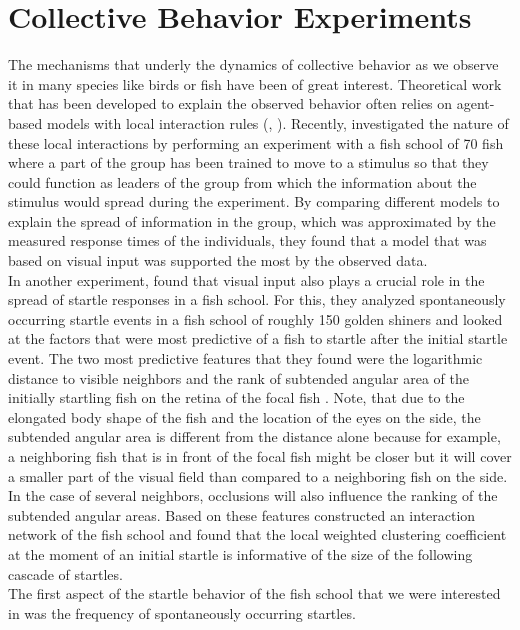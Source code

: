 \documentclass[a4paper,10pt,hidelinks]{scrreprt}
\begin{document}
    \section{Collective Behavior Experiments}
    The mechanisms that underly the dynamics of collective behavior as we observe it in many species like birds or fish have been of great interest.
    Theoretical work that has been developed to explain the observed behavior often relies on agent-based models with local interaction rules (\cite{Couzin2002}, \cite{Vicsek1995}).
    Recently, \cite{Strandburg-Peshkin2013} investigated the nature of these local interactions by performing an experiment with a fish school of 70 fish where a part of the group has been trained to move to a stimulus so that they could function as leaders of the group from which the information about the stimulus would spread during the experiment.
    By comparing different models to explain the spread of information in the group, which was approximated by the measured response times of the individuals, they found that a model that was based on visual input was supported the most by the observed data.\\
    In another experiment, \cite{Rosenthal2015} found that visual input also plays a crucial role in the spread of startle responses in a fish school.
    For this, they analyzed spontaneously occurring startle events in a fish school of roughly 150 golden shiners and looked at the factors that were most predictive of a fish to startle after the initial startle event.
    The two most predictive features that they found were the logarithmic distance to visible neighbors and the rank of subtended angular area of the initially startling fish on the retina of the focal fish \citep{Rosenthal2015}.
    Note, that due to the elongated body shape of the fish and the location of the eyes on the side, the subtended angular area is different from the distance alone because for example, a neighboring fish that is in front of the focal fish might be closer but it will cover a smaller part of the visual field than compared to a neighboring fish on the side.
    In the case of several neighbors, occlusions will also influence the ranking of the subtended angular areas.
    Based on these features \cite{Rosenthal2015} constructed an interaction network of the fish school and found that the local weighted clustering coefficient at the moment of an initial startle is informative of the size of the following cascade of startles.\\
    The first aspect of the startle behavior of the fish school that we were interested in was the frequency of spontaneously occurring startles.
\end{document}
